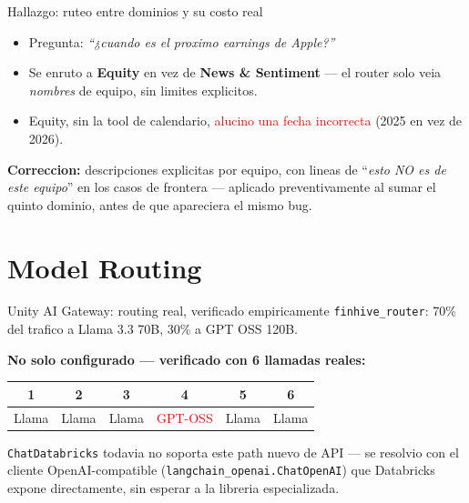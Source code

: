\documentclass[11pt]{beamer}
\newcommand{\hlr}[1]{\textcolor{red}{#1}}
\begin{document}
\begin{frame}{Hallazgo: ruteo entre dominios y su costo real}
\begin{itemize}
    \item Pregunta: \emph{``¿cuando es el proximo earnings de Apple?''}
    \item Se enruto a \textbf{Equity} en vez de \textbf{News \& Sentiment} --- el router
    solo veia \emph{nombres} de equipo, sin limites explicitos.
    \item Equity, sin la tool de calendario, \hlr{alucino una fecha incorrecta} (2025 en
    vez de 2026).
\end{itemize}

\vspace{3mm}
\textbf{Correccion:} descripciones explicitas por equipo, con lineas de
``\emph{esto NO es de este equipo}'' en los casos de frontera --- aplicado
preventivamente al sumar el quinto dominio, antes de que apareciera el mismo bug.
\end{frame}

\section{Model Routing}

\begin{frame}{Unity AI Gateway: routing real, verificado empiricamente}
\texttt{finhive\_router}: 70\% del trafico a Llama 3.3 70B, 30\% a GPT OSS 120B.

\vspace{3mm}
\textbf{No solo configurado --- verificado con 6 llamadas reales:}

\vspace{2mm}
\begin{center}
\begin{tabular}{cccccc}
\toprule
1 & 2 & 3 & 4 & 5 & 6 \\
\midrule
Llama & Llama & Llama & \hlr{GPT-OSS} & Llama & Llama \\
\bottomrule
\end{tabular}
\end{center}

\vspace{3mm}
\texttt{ChatDatabricks} todavia no soporta este path nuevo de API --- se resolvio con el
cliente OpenAI-compatible (\texttt{langchain\_openai.ChatOpenAI}) que Databricks expone
directamente, sin esperar a la libreria especializada.
\end{frame}
\end{document}
